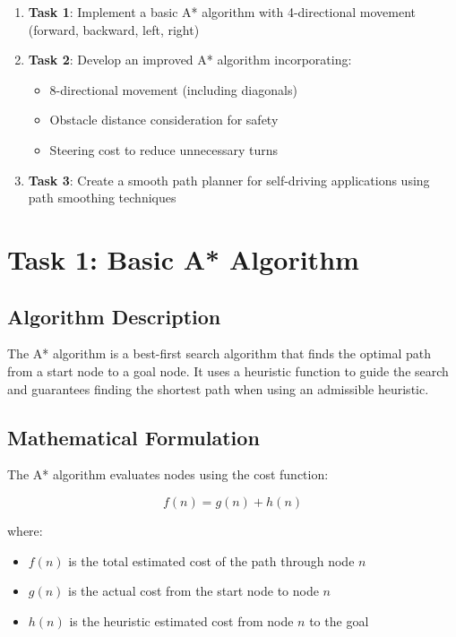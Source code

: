 \documentclass[aps,letterpaper,10pt]{revtex4}
\begin{document}
\begin{enumerate}
    \item \textbf{Task 1}: Implement a basic A* algorithm with 4-directional movement (forward, backward, left, right)
    \item \textbf{Task 2}: Develop an improved A* algorithm incorporating:
    \begin{itemize}
        \item 8-directional movement (including diagonals)
        \item Obstacle distance consideration for safety
        \item Steering cost to reduce unnecessary turns
    \end{itemize}
    \item \textbf{Task 3}: Create a smooth path planner for self-driving applications using path smoothing techniques
\end{enumerate}

\newpage
\section{Task 1: Basic A* Algorithm}

\subsection{Algorithm Description}

The A* algorithm is a best-first search algorithm that finds the optimal path from a start node to a goal node. It uses a heuristic function to guide the search and guarantees finding the shortest path when using an admissible heuristic.

\subsection{Mathematical Formulation}

The A* algorithm evaluates nodes using the cost function:

\begin{equation}
f(n) = g(n) + h(n)
\end{equation}

where:
\begin{itemize}
    \item $f(n)$ is the total estimated cost of the path through node $n$
    \item $g(n)$ is the actual cost from the start node to node $n$
    \item $h(n)$ is the heuristic estimated cost from node $n$ to the goal
\end{itemize}
\end{document}
